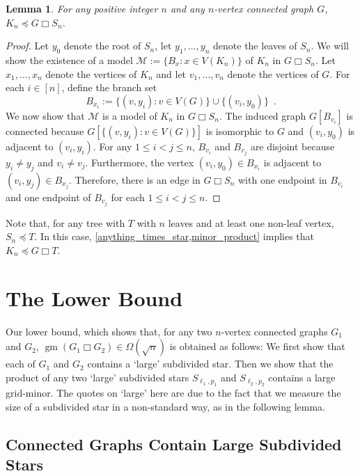 \documentclass[12pt]{article}
\newcommand{\boxprod}{\mathbin{\Box}}
\renewcommand{\le}{\leqslant}
\DeclareMathOperator{\gm}{gm}
\theoremstyle{plain}
\newtheorem{lem}[thm]{Lemma}
\theoremstyle{definition}
\begin{document}
\begin{lem}\label{anything_times_star}
  For any positive integer $n$ and any $n$-vertex connected graph $G$, $K_{n} \preceq G\boxprod S_n$.
\end{lem}

\begin{proof}
  Let $y_0$ denote the root of $S_n$, let $y_1,\ldots,y_n$ denote the leaves of $S_n$.  We will show the existence of a model $\mathcal{M}:=\{B_x:x\in V(K_n)\}$ of $K_n$ in $G\boxprod S_n$.  Let $x_1,\ldots,x_{n}$ denote the vertices of $K_{n}$ and let $v_1,\ldots,v_n$ denote the vertices of $G$.  For each $i\in[n]$, define the branch set
  \[
     B_{x_i}:=\{(v,y_i):v\in V(G)\} \cup \{ (v_{i},y_0) \} \enspace .
  \]
  We now show that $\mathcal{M}$ is a model of $K_n$ in $G\boxprod S_n$.
  The induced graph $G[B_{v_i}]$ is connected because $G[\{(v,y_i):v\in V(G)\}]$ is isomorphic to $G$ and $(v_{i},y_0)$ is adjacent to $(v_{i},y_i)$.
  For any $1\le i< j\le n$, $B_{v_i}$ and $B_{v_j}$ are disjoint because $y_i\neq y_j$ and $v_i\neq v_j$.  Furthermore, the vertex $(v_{i},y_0)\in B_{x_i}$ is adjacent to $(v_i,y_j)\in B_{x_j}$.  Therefore, there is an edge in $G\boxprod S_n$ with one endpoint in $B_{v_i}$ and one endpoint of $B_{v_j}$ for each $1\le i < j\le n$.
\end{proof}

Note that, for any tree with $T$ with $n$ leaves and at least one non-leaf vertex, $S_n\preceq T$.  In this case, \cref{anything_times_star,minor_product} implies that $K_n\preceq G\boxprod T$.

\section{The Lower Bound}

Our lower bound, which shows that, for any two $n$-vertex connected graphs $G_1$ and $G_2$, $\gm(G_1\boxprod G_2)\in\Omega(\sqrt{n})$ is obtained as follows:  We first show that each of $G_1$ and $G_2$ contains a `large' subdivided star.  Then we show that the product of any two `large' subdivided stars $S_{\ell_1, p_1}$ and $S_{\ell_2, p_2}$ contains a large grid-minor.  The quotes on `large' here are due to the fact that we measure the size of a subdivided star in a non-standard way, as in the following lemma. 

\subsection{Connected Graphs Contain Large Subdivided Stars}
\end{document}
